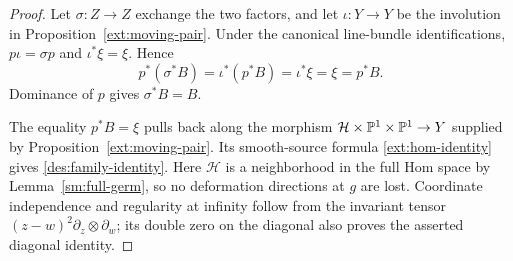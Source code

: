 \begin{proof}
Let $\sigma:Z\to Z$ exchange the two factors, and let
$\iota:Y\to Y$ be the involution in
Proposition~\ref{ext:moving-pair}. Under the canonical line-bundle
identifications, $p\iota=\sigma p$ and $\iota^*\xi=\xi$. Hence
\[
p^*(\sigma^*B)=\iota^*(p^*B)=\iota^*\xi=\xi=p^*B.
\]
Dominance of $p$ gives $\sigma^*B=B$.

The equality $p^*B=\xi$ pulls back along the morphism
$\mathcal H\times\mathbb P^1\times\mathbb P^1\to Y$ supplied by
Proposition~\ref{ext:moving-pair}. Its smooth-source formula
\eqref{ext:hom-identity} gives \eqref{des:family-identity}.
Here $\mathcal H$ is a neighborhood in the full Hom space by
Lemma~\ref{sm:full-germ}, so no deformation directions at $g$ are lost.
Coordinate independence
and regularity at infinity follow from the invariant tensor
$(z-w)^2\partial_z\otimes\partial_w$; its double zero on the
diagonal also proves the asserted diagonal identity.
\end{proof}
